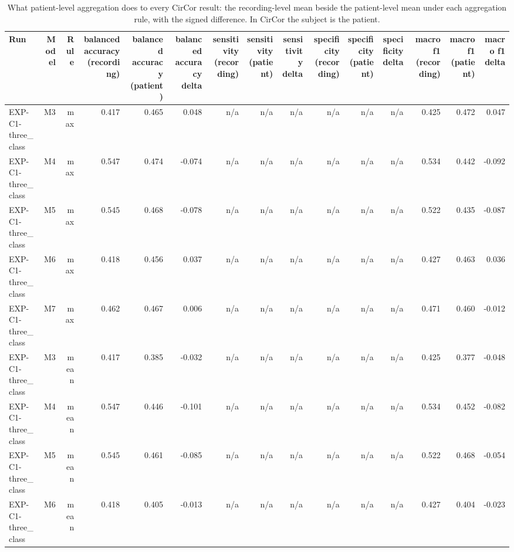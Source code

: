 \begin{table}[htbp]
  \centering
  \caption{What patient-level aggregation does to every CirCor result: the recording-level mean beside the patient-level mean under each aggregation rule, with the signed difference. In CirCor the subject is the patient.}
  \label{tab:t15}
  \begin{tabular}{lrrrrrrrrrrrrrr}
    \toprule
    Run & Model & Rule & balanced accuracy (recording) & balanced accuracy (patient) & balanced accuracy delta & sensitivity (recording) & sensitivity (patient) & sensitivity delta & specificity (recording) & specificity (patient) & specificity delta & macro f1 (recording) & macro f1 (patient) & macro f1 delta \\
    \midrule
    EXP-C1-three\_class & M3 & max & 0.417 & 0.465 & 0.048 & n/a & n/a & n/a & n/a & n/a & n/a & 0.425 & 0.472 & 0.047 \\
    EXP-C1-three\_class & M4 & max & 0.547 & 0.474 & -0.074 & n/a & n/a & n/a & n/a & n/a & n/a & 0.534 & 0.442 & -0.092 \\
    EXP-C1-three\_class & M5 & max & 0.545 & 0.468 & -0.078 & n/a & n/a & n/a & n/a & n/a & n/a & 0.522 & 0.435 & -0.087 \\
    EXP-C1-three\_class & M6 & max & 0.418 & 0.456 & 0.037 & n/a & n/a & n/a & n/a & n/a & n/a & 0.427 & 0.463 & 0.036 \\
    EXP-C1-three\_class & M7 & max & 0.462 & 0.467 & 0.006 & n/a & n/a & n/a & n/a & n/a & n/a & 0.471 & 0.460 & -0.012 \\
    EXP-C1-three\_class & M3 & mean & 0.417 & 0.385 & -0.032 & n/a & n/a & n/a & n/a & n/a & n/a & 0.425 & 0.377 & -0.048 \\
    EXP-C1-three\_class & M4 & mean & 0.547 & 0.446 & -0.101 & n/a & n/a & n/a & n/a & n/a & n/a & 0.534 & 0.452 & -0.082 \\
    EXP-C1-three\_class & M5 & mean & 0.545 & 0.461 & -0.085 & n/a & n/a & n/a & n/a & n/a & n/a & 0.522 & 0.468 & -0.054 \\
    EXP-C1-three\_class & M6 & mean & 0.418 & 0.405 & -0.013 & n/a & n/a & n/a & n/a & n/a & n/a & 0.427 & 0.404 & -0.023 \\

\end{tabular}
\end{table}
